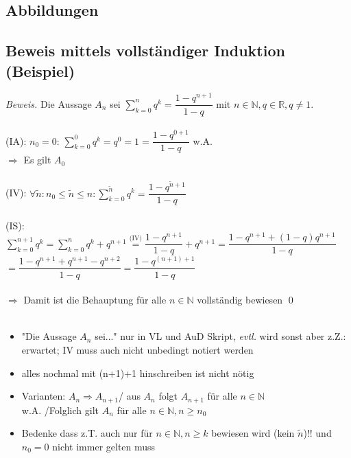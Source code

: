 \documentclass[10pt,a4paper]{article}
\begin{document}
\subsection{Abbildungen}



\subsection{Beweis mittels vollständiger Induktion (Beispiel)}
\textit{Beweis.}
Die Aussage $A_{n}$ sei $\sum_{k=0}^{n} q^{k}= \dfrac{1-q^{n+1}}{1-q}$ mit $n \in \mathbb{N}, q \in \mathbb{R}, q \neq 1$.\\\\
(IA): $n_{0}=0$: $\sum_{k=0}^{0} q^{k}=q^{0}=1= \dfrac{1-q^{0+1}}{1-q}$ \hspace{0.3cm} w.A.\\
\hspace*{1cm}$\Rightarrow$ Es gilt $A_{0}$\\\\
(IV): $\forall \tilde{n}: n_{0} \leq \tilde{n} \leq n:\sum_{k=0}^{\tilde{n}} q^{k}= \dfrac{1-q^{\tilde{n}+1}}{1-q}$\\\\
(IS):$\sum_{k=0}^{n+1} q^{k}= \sum_{k=0}^{n} q^{k}+q^{n+1}\stackrel{\text{(IV)}}{=}\dfrac{1-q^{n+1}}{1-q}+q^{n+1}=\dfrac{1-q^{n+1}+(1-q)q^{n+1}}{1-q}$\\
\hspace*{2.23cm}$=\dfrac{1-q^{n+1}+q^{n+1}-q^{n+2}}{1-q}=\dfrac{1-q^{(n+1)+1}}{1-q}$\\\\
\hspace*{1cm}$\Rightarrow$ Damit ist die Behauptung für alle $n \in \mathbb{N}$ vollständig bewiesen
\qed\\\\
\begin{itemize}
\item "Die Aussage $A_{n}$ sei..." nur in VL und AuD Skript, \textit{evtl.} wird sonst aber z.Z.: erwartet; IV muss auch nicht unbedingt notiert werden
\item alles nochmal mit (n+1)+1 hinschreiben ist nicht nötig
\item Varianten: $A_{n} \Rightarrow A_{n+1}$/ aus $A_{n}$ folgt $A_{n+1}$ für alle $n\in \mathbb{N}$\\
 w.A. /Folglich gilt $A_{n}$ für alle $n \in \mathbb{N}, n \geq n_{0}$
\item Bedenke dass z.T. auch nur für $n \in \mathbb{N}, n\geq k$ bewiesen wird (kein $\tilde{n}$)!! und $n_{0}=0$ nicht immer gelten muss
\end{itemize}
\end{document}
